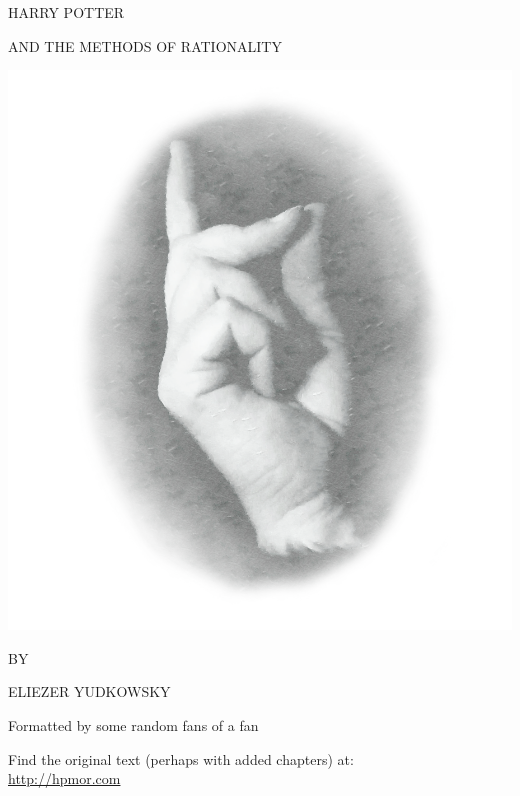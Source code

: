 \begin{center}
\thispagestyle{empty}
{\hp
\Huge\MakeUppercase{Harry Potter}\vspace*{0.5cm}

\Large\MakeUppercase{and the Methods of Rationality} %
 
\includegraphics[scale=0.5]{bubble0.png} 

\Large BY \vspace*{.25cm}

\huge ELIEZER YUDKOWSKY%

\normalsize
Formatted by some random fans of a fan
}

\vspace{3cm}
Find the original text (perhaps with added chapters) at:\\
\url{http://hpmor.com} \\

\end{center}
\clearpage

